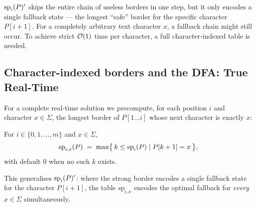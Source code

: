 $\mathrm{sp}_{i}(P)'$ skips the entire chain of useless borders in one step, but it only encodes a
single fallback state --- the longest ``safe'' border for the specific character $P[i+1]$.
For a completely arbitrary text character $x$, a fallback chain might still occur. To achieve 
strict $\mathcal{O}\!\left(1\right)$ time per character, a full character-indexed table is needed.

\subsection{Character-indexed borders and the DFA: True Real-Time}

For a complete real-time solution we precompute, for each position $i$ and character
$x \in \Sigma$, the longest border of $P[1\ldots i]$ whose next character is exactly $x$:

\begin{definition}[$sp_{i,x}$ values]
  For $i \in \{0,1,\ldots,m\}$ and $x \in \Sigma$,
  \[
    \mathrm{sp}_{i,x}(P) \;=\; \max\bigl\{\, k \leq \mathrm{sp}_{i}(P) \mid P[k+1] = x \,\bigr\},
  \]
  with default $0$ when no such $k$ exists.
\end{definition}

This generalises $\mathrm{sp}_{i}(P)'$: where the strong border encodes a single fallback state for the
character $P[i+1]$, the table $\mathrm{sp}_{i,x}$ encodes the optimal fallback for \emph{every}
$x \in \Sigma$ simultaneously.

